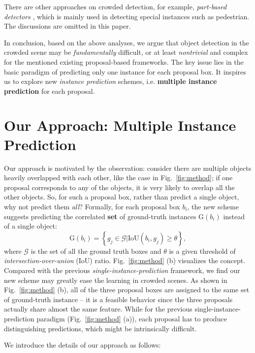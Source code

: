 \documentclass[10pt,twocolumn,letterpaper]{article}
\begin{document}
There are other approaches on crowded detection, for example, \emph{part-based detectors} \cite{occludedattention,tian2015deep,Zhou_2018_ECCV,chi2019pedhunter}, which is mainly used in detecting special instances such as pedestrian. The discussions are omitted in this paper. 

In conclusion, based on the above analyses, we argue that object detection in the crowded scene may be \emph{fundamentally} difficult, or at least \emph{nontrivial} and complex for the mentioned existing proposal-based frameworks. The key issue lies in the basic paradigm of predicting only one instance for each proposal box. It inspires us to explore new \emph{instance prediction} schemes, i.e. \textbf{multiple instance prediction} for each proposal. 

\section{Our Approach: Multiple Instance Prediction}
\label{sec:ourapproach}
Our approach is motivated by the observation: consider there are multiple objects heavily overlapped with each other, like the case in Fig.~\ref{fig:method}; if one proposal corresponds to any of the objects, it is very likely to overlap all the other objects. So, for such a proposal box, rather than predict a single object, why not predict them \emph{all}? Formally, for each proposal box $b_i$, the new scheme suggests predicting the correlated \textbf{set} of ground-truth instances $\mathrm{G}(b_i)$ instead of a single object:
\begin{equation}
\mathrm{G}(b_i) = \left\{ g_j \in \mathcal{G} | \mathrm{IoU} (b_i, g_j)\ge \theta \right\}, 
\label{equ:gt_set}
\end{equation}
where $\mathcal{G}$ is the set of all the ground truth boxes and $\theta$ is a given threshold of \emph{intersection-over-union} (IoU) ratio. Fig.~\ref{fig:method} (b) visualizes the concept. Compared with the previous \emph{single-instance-prediction} framework, we find our new scheme may greatly ease the learning in crowded scenes. As shown in Fig.~\ref{fig:method} (b), all of the three proposal boxes are assigned to the same set of ground-truth instance -- it is a feasible behavior since the three proposals actually share almost the same feature. While for the previous single-instance-prediction paradigm (Fig.~\ref{fig:method} (a)), each proposal has to produce distinguishing predictions, which might be intrinsically difficult.  
 
We introduce the details of our approach as follows:
\end{document}
